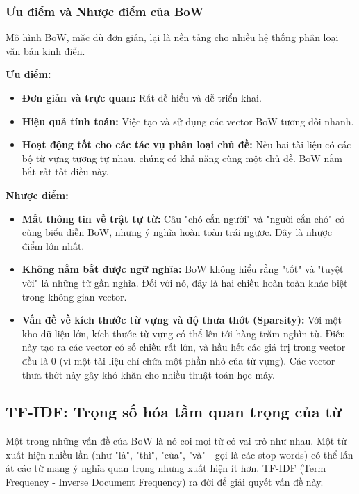 \subsubsection{Ưu điểm và Nhược điểm của BoW}
Mô hình BoW, mặc dù đơn giản, lại là nền tảng cho nhiều hệ thống phân loại văn bản kinh điển.
\begin{tcolorbox}[
    title=Đánh giá mô hình Bag-of-Words,
    colback=blue!5!white, colframe=blue!50!black, fonttitle=\bfseries,
    breakable
]
\textbf{Ưu điểm:}
\begin{itemize}
    \item \textbf{Đơn giản và trực quan:} Rất dễ hiểu và dễ triển khai.
    \item \textbf{Hiệu quả tính toán:} Việc tạo và sử dụng các vector BoW tương đối nhanh.
    \item \textbf{Hoạt động tốt cho các tác vụ phân loại chủ đề:} Nếu hai tài liệu có các bộ từ vựng tương tự nhau, chúng có khả năng cùng một chủ đề. BoW nắm bắt rất tốt điều này.
\end{itemize}
\textbf{Nhược điểm:}
\begin{itemize}
    \item \textbf{Mất thông tin về trật tự từ:} Câu "chó cắn người" và "người cắn chó" có cùng biểu diễn BoW, nhưng ý nghĩa hoàn toàn trái ngược. Đây là nhược điểm lớn nhất.
    \item \textbf{Không nắm bắt được ngữ nghĩa:} BoW không hiểu rằng "tốt" và "tuyệt vời" là những từ gần nghĩa. Đối với nó, đây là hai chiều hoàn toàn khác biệt trong không gian vector.
    \item \textbf{Vấn đề về kích thước từ vựng và độ thưa thớt (Sparsity):} Với một kho dữ liệu lớn, kích thước từ vựng có thể lên tới hàng trăm nghìn từ. Điều này tạo ra các vector có số chiều rất lớn, và hầu hết các giá trị trong vector đều là 0 (vì một tài liệu chỉ chứa một phần nhỏ của từ vựng). Các vector thưa thớt này gây khó khăn cho nhiều thuật toán học máy.
\end{itemize}
\end{tcolorbox}


\subsection{TF-IDF: Trọng số hóa tầm quan trọng của từ}
\label{ssec:tfidf}

Một trong những vấn đề của BoW là nó coi mọi từ có vai trò như nhau. Một từ xuất hiện nhiều lần (như "là", "thì", "của", "và" - gọi là các stop words) có thể lấn át các từ mang ý nghĩa quan trọng nhưng xuất hiện ít hơn. TF-IDF (Term Frequency - Inverse Document Frequency) \cite{sparck1972statistical} ra đời để giải quyết vấn đề này.

